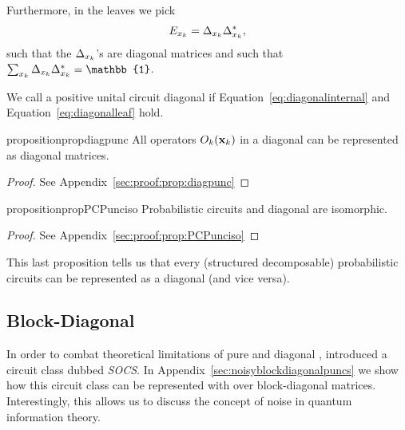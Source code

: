 Furthermore, in the leaves we pick
\begin{align}
	E_{x_k} = \Delta_{x_k}  \Delta_{x_k}^*,
	\label{eq:diagonalleaf}
\end{align}
such that the $\Delta_{x_k}$'s are diagonal matrices and such that $\sum_{\xvar_k} \Delta_{\xvar_k} \Delta_{\xvar_k}^*=\mathbb{1}$.


\begin{definition}
	We call a positive unital circuit diagonal if Equation~\ref{eq:diagonalinternal} and Equation~\ref{eq:diagonalleaf} hold.
\end{definition}


\begin{restatable}{proposition}{propdiagpunc}
	\label{prop:diagpunc}
	All operators $O_k (\mathbf{x}_k)$ in a diagonal \punc can be represented as diagonal matrices.
\end{restatable}

\begin{proof}
	See Appendix~\ref{sec:proof:prop:diagpunc}
\end{proof}











\begin{restatable}{proposition}{propPCPunciso}
	\label{prop:PCPunciso}
	Probabilistic circuits and diagonal \puncs are isomorphic.
\end{restatable}



\begin{proof}
	See Appendix~\ref{sec:proof:prop:PCPunciso}
\end{proof}

This last proposition tells us that every (structured decomposable) probabilistic circuits can be represented as a diagonal \punc (and vice versa).



\subsection{Block-Diagonal \puncs}

In order to combat theoretical limitations of pure and diagonal \puncs, \citet{loconte2025sum} introduced a circuit class dubbed \textit{\textmu SOCS}. In Appendix~\ref{sec:noisyblockdiagonalpuncs} we show how this circuit class can be represented with \puncs over block-diagonal matrices. Interestingly, this allows us to discuss the concept of noise in quantum information theory.





